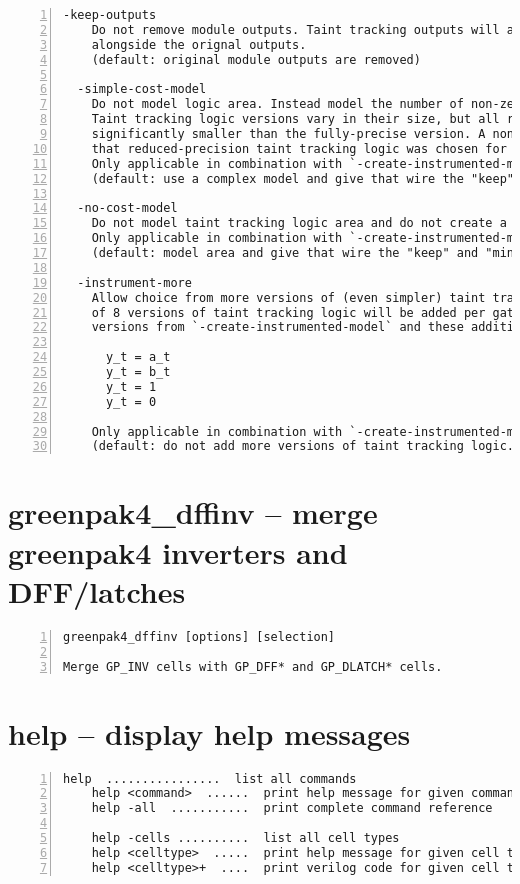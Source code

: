 \begin{lstlisting}[numbers=left,frame=single]
  -keep-outputs
    Do not remove module outputs. Taint tracking outputs will appear in the module ports
    alongside the orignal outputs.
    (default: original module outputs are removed)

  -simple-cost-model
    Do not model logic area. Instead model the number of non-zero assignments to $anyconsts.
    Taint tracking logic versions vary in their size, but all reduced-precision versions are
    significantly smaller than the fully-precise version. A non-zero $anyconst assignment means
    that reduced-precision taint tracking logic was chosen for some gate.
    Only applicable in combination with `-create-instrumented-model`.
    (default: use a complex model and give that wire the "keep" and "minimize" attributes)

  -no-cost-model
    Do not model taint tracking logic area and do not create a `__glift_weight` wire.
    Only applicable in combination with `-create-instrumented-model`.
    (default: model area and give that wire the "keep" and "minimize" attributes)

  -instrument-more
    Allow choice from more versions of (even simpler) taint tracking logic. A total
    of 8 versions of taint tracking logic will be added per gate, including the 4
    versions from `-create-instrumented-model` and these additional versions:

      y_t = a_t
      y_t = b_t
      y_t = 1
      y_t = 0

    Only applicable in combination with `-create-instrumented-model`.
    (default: do not add more versions of taint tracking logic.
\end{lstlisting}

\section{greenpak4\_dffinv -- merge greenpak4 inverters and DFF/latches}
\label{cmd:greenpak4_dffinv}
\begin{lstlisting}[numbers=left,frame=single]
    greenpak4_dffinv [options] [selection]

Merge GP_INV cells with GP_DFF* and GP_DLATCH* cells.
\end{lstlisting}

\section{help -- display help messages}
\label{cmd:help}
\begin{lstlisting}[numbers=left,frame=single]
    help  ................  list all commands
    help <command>  ......  print help message for given command
    help -all  ...........  print complete command reference

    help -cells ..........  list all cell types
    help <celltype>  .....  print help message for given cell type
    help <celltype>+  ....  print verilog code for given cell type
\end{lstlisting}

